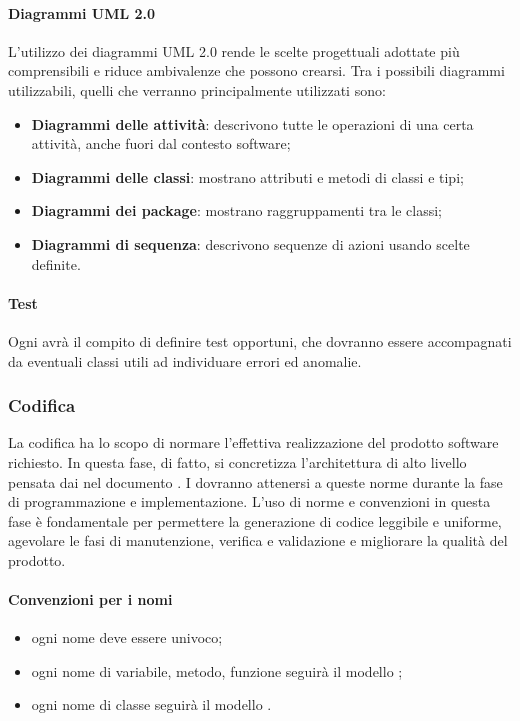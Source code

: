 \paragraph{Diagrammi UML 2.0}
L'utilizzo dei diagrammi UML 2.0 rende le scelte progettuali adottate più comprensibili e riduce ambivalenze che possono crearsi. Tra i possibili diagrammi utilizzabili, quelli che verranno principalmente utilizzati sono:
\begin{itemize}
\item \textbf{Diagrammi delle attività}: descrivono tutte le operazioni di una certa attività, anche fuori dal contesto software;
\item \textbf{Diagrammi delle classi}: mostrano attributi e metodi di classi e tipi;
\item \textbf{Diagrammi dei package}: mostrano raggruppamenti tra le classi;
\item \textbf{Diagrammi di sequenza}: descrivono sequenze di azioni usando scelte definite.
\end{itemize}
\paragraph{Test}
Ogni \prog{} avrà il compito di definire test opportuni, che dovranno essere accompagnati da eventuali classi utili ad individuare errori ed anomalie.
\subsubsection{Codifica}
La codifica ha lo scopo di normare l'effettiva realizzazione del prodotto software richiesto. In questa fase, di fatto, si concretizza l'architettura di alto livello pensata dai \progs{} nel documento \PdQ{}. I \progrs{} dovranno attenersi a queste norme durante la fase di programmazione e implementazione. L'uso di norme e convenzioni in questa fase è fondamentale per permettere la generazione di codice leggibile e uniforme, agevolare le fasi di manutenzione, verifica e validazione e migliorare la qualità del prodotto.
\paragraph{Convenzioni per i nomi}
\begin{itemize}
	\item ogni nome deve essere univoco;
	\item ogni nome di variabile, metodo, funzione seguirà il modello ;
	\item ogni nome di classe seguirà il modello .
\end{itemize}
\newpage
